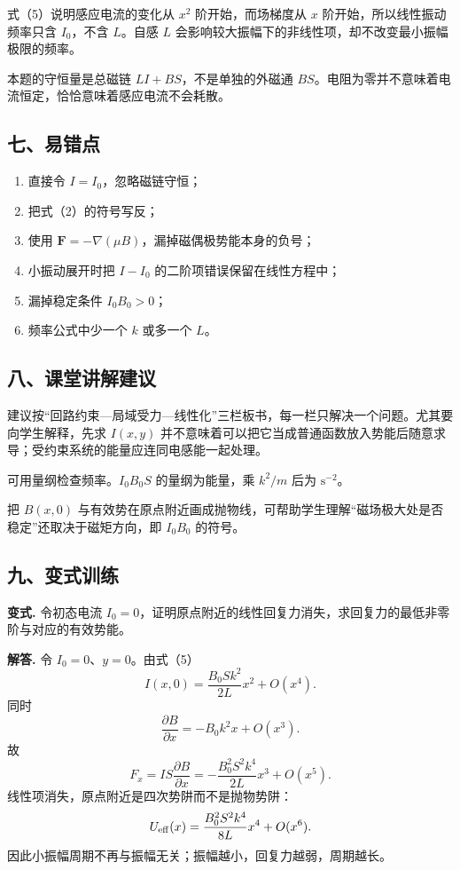\documentclass[12pt,a4paper,UTF8]{ctexart}
\newcommand{\tightlist}{\setlength{\itemsep}{0pt}\setlength{\parskip}{0pt}}
\begin{document}
式（5）说明感应电流的变化从 \(x^2\) 阶开始，而场梯度从 \(x\)
阶开始，所以线性振动频率只含 \(I_0\)，不含 \(L\)。自感 \(L\)
会影响较大振幅下的非线性项，却不改变最小振幅极限的频率。

本题的守恒量是总磁链 \(LI+BS\)，不是单独的外磁通
\(BS\)。电阻为零并不意味着电流恒定，恰恰意味着感应电流不会耗散。

\subsection{七、易错点}\label{ux4e03ux6613ux9519ux70b9-4}

\begin{enumerate}
\def\labelenumi{\arabic{enumi}.}
\tightlist
\item
  直接令 \(I=I_0\)，忽略磁链守恒；
\item
  把式（2）的符号写反；
\item
  使用 \(\boldsymbol F=-\nabla(\mu B)\)，漏掉磁偶极势能本身的负号；
\item
  小振动展开时把 \(I-I_0\) 的二阶项错误保留在线性方程中；
\item
  漏掉稳定条件 \(I_0B_0>0\)；
\item
  频率公式中少一个 \(k\) 或多一个 \(L\)。
\end{enumerate}

\subsection{八、课堂讲解建议}\label{ux516bux8bfeux5802ux8bb2ux89e3ux5efaux8bae-4}

建议按``回路约束---局域受力---线性化''三栏板书，每一栏只解决一个问题。尤其要向学生解释，先求
\(I(x,y)\)
并不意味着可以把它当成普通函数放入势能后随意求导；受约束系统的能量应连同电感能一起处理。

可用量纲检查频率。\(I_0B_0S\) 的量纲为能量，乘 \(k^2/m\) 后为
\(\mathrm{s^{-2}}\)。

把 \(B(x,0)\)
与有效势在原点附近画成抛物线，可帮助学生理解``磁场极大处是否稳定''还取决于磁矩方向，即
\(I_0B_0\) 的符号。

\subsection{九、变式训练}\label{ux4e5dux53d8ux5f0fux8badux7ec3-4}

\textbf{变式.} 令初态电流
\(I_0=0\)，证明原点附近的线性回复力消失，求回复力的最低非零阶与对应的有效势能。

\textbf{解答.} 令 \(I_0=0\)、\(y=0\)。由式（5） \[
I(x,0)=\frac{B_0Sk^2}{2L}x^2+O(x^4).
\] 同时 \[
\frac{\partial B}{\partial x}
=-B_0k^2x+O(x^3).
\] 故 \[
F_x=IS\frac{\partial B}{\partial x}
=-\frac{B_0^2S^2k^4}{2L}x^3+O(x^5). \tag{9}
\] 线性项消失，原点附近是四次势阱而不是抛物势阱： \[
U_{\rm eff}(x)
=\frac{B_0^2S^2k^4}{8L}x^4+O(x^6).
\] 因此小振幅周期不再与振幅无关；振幅越小，回复力越弱，周期越长。
\end{document}

